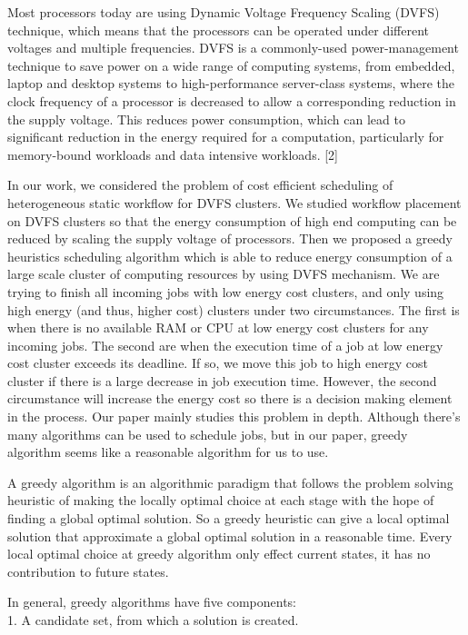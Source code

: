 \documentclass[conference]{IEEEtran}
\begin{document}
Most processors today are using Dynamic Voltage Frequency Scaling (DVFS) technique, which means that the processors can be operated under different voltages and multiple frequencies. DVFS is a commonly-used power-management technique to save power on a wide range of computing systems, from embedded, laptop and desktop systems to high-performance server-class systems, where the clock frequency of a processor is decreased to allow a corresponding reduction in the supply voltage. This reduces power consumption, which can lead to significant reduction in the energy required for a computation, particularly for memory-bound workloads and data intensive workloads. [2]

In our work, we considered the problem of cost efficient scheduling of heterogeneous static workflow for DVFS clusters. We studied workflow placement on DVFS clusters so that the energy consumption of high end computing can be reduced by scaling the supply voltage of processors. Then we proposed a greedy heuristics scheduling algorithm which is able to reduce energy consumption of a large scale cluster of computing resources by using DVFS mechanism. We are trying to finish all incoming jobs with low energy cost clusters, and only using high energy (and thus, higher cost) clusters under two circumstances. The first is when there is no available RAM or CPU at low energy cost clusters for any incoming jobs. The second are when the execution time of a job at low energy cost cluster exceeds its deadline. If so, we move this job to high energy cost cluster if there is a large decrease in job execution time. However, the second circumstance will increase the energy cost so there is a decision making element in the process. Our paper mainly studies this problem in depth. Although there’s many algorithms can be used to schedule jobs, but in our paper, greedy algorithm seems like a reasonable algorithm for us to use. 

A greedy algorithm is an algorithmic paradigm that follows the problem solving heuristic of making the locally optimal choice at each stage with the hope of finding a global optimal solution. So a greedy heuristic can give a local optimal solution that approximate a global optimal solution in a reasonable time. Every local optimal choice at greedy algorithm only effect current states, it has no contribution to future states. 

In general, greedy algorithms have five components:\\

1.	A candidate set, from which a solution is created.
\end{document}
